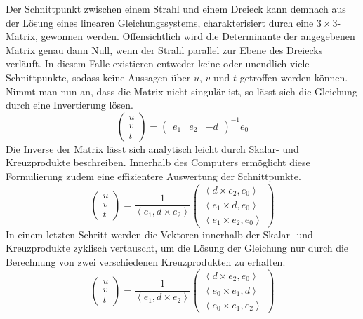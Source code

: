 \documentclass[crop=false]{standalone}
\begin{document}
      Der Schnittpunkt zwischen einem Strahl und einem Dreieck kann demnach aus der Lösung eines linearen Gleichungssystems, charakterisiert durch eine $3\times 3$-Matrix, gewonnen werden.
      Offensichtlich wird die Determinante der angegebenen Matrix genau dann Null, wenn der Strahl parallel zur Ebene des Dreiecks verläuft.
      In diesem Falle existieren entweder keine oder unendlich viele Schnittpunkte, sodass keine Aussagen über $u$, $v$ und $t$ getroffen werden können.
      Nimmt man nun an, dass die Matrix nicht singulär ist, so lässt sich die Gleichung durch eine Invertierung lösen.
      \[
        \begin{pmatrix}
          u \\
          v \\
          t
        \end{pmatrix}
        =
        \begin{pmatrix}
          e_1 &
          e_2 &
          -d
        \end{pmatrix}^{-1}
        e_0
      \]
      Die Inverse der Matrix lässt sich analytisch leicht durch Skalar- und Kreuzprodukte beschreiben.
      Innerhalb des Computers ermöglicht diese Formulierung zudem eine effizientere Auswertung der Schnittpunkte.
      \[
        \begin{pmatrix}
          u \\
          v \\
          t
        \end{pmatrix}
        =
        \frac{1}{\left\langle e_1, d\times e_2  \right\rangle}
        \begin{pmatrix}
          \left\langle d\times e_2 , e_0 \right\rangle \\
          \left\langle e_1\times d , e_0 \right\rangle \\
          \left\langle e_1\times e_2, e_0 \right\rangle
        \end{pmatrix}
      \]
      In einem letzten Schritt werden die Vektoren innerhalb der Skalar- und Kreuzprodukte zyklisch vertauscht, um die Lösung der Gleichung nur durch die Berechnung von zwei verschiedenen Kreuzprodukten zu erhalten.
      \[
        \begin{pmatrix}
          u \\
          v \\
          t
        \end{pmatrix}
        =
        \frac{1}{\left\langle e_1, d\times e_2  \right\rangle}
        \begin{pmatrix}
          \left\langle d\times e_2 , e_0 \right\rangle \\
          \left\langle e_0\times e_1 , d \right\rangle \\
          \left\langle e_0\times e_1, e_2 \right\rangle
        \end{pmatrix}
      \]
\end{document}
